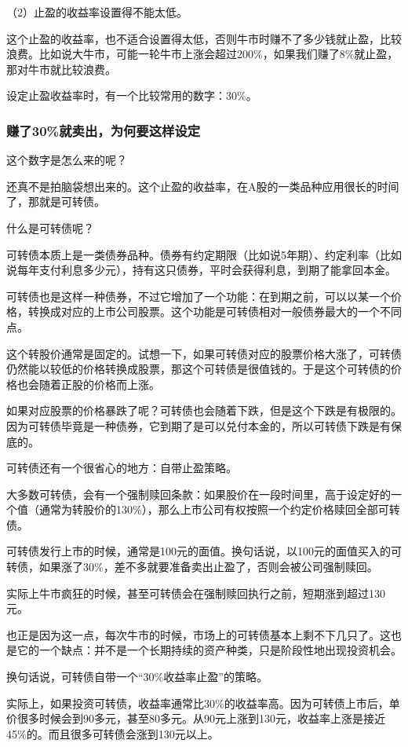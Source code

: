 （2）止盈的收益率设置得不能太低。

这个止盈的收益率，也不适合设置得太低，否则牛市时赚不了多少钱就止盈，比较浪费。比如说大牛市，可能一轮牛市上涨会超过200\%，如果我们赚了8\%就止盈，那对牛市就比较浪费。

设定止盈收益率时，有一个比较常用的数字：30\%。

\subsubsection{赚了30\%就卖出，为何要这样设定}

这个数字是怎么来的呢？

还真不是拍脑袋想出来的。这个止盈的收益率，在A股的一类品种应用很长的时间了，那就是可转债。

什么是可转债呢？

可转债本质上是一类债券品种。债券有约定期限（比如说5年期）、约定利率（比如说每年支付利息多少元），持有这只债券，平时会获得利息，到期了能拿回本金。

可转债也是这样一种债券，不过它增加了一个功能：在到期之前，可以以某一个价格，转换成对应的上市公司股票。这个功能是可转债相对一般债券最大的一个不同点。

这个转股价通常是固定的。试想一下，如果可转债对应的股票价格大涨了，可转债仍然能以较低的价格转换成股票，那这个可转债是很值钱的。于是这个可转债的价格也会随着正股的价格而上涨。

如果对应股票的价格暴跌了呢？可转债也会随着下跌，但是这个下跌是有极限的。因为可转债毕竟是一种债券，它到期了是可以兑付本金的，所以可转债下跌是有保底的。

可转债还有一个很省心的地方：自带止盈策略。

大多数可转债，会有一个强制赎回条款：如果股价在一段时间里，高于设定好的一个值（通常为转股价的130\%），那么上市公司有权按照一个约定价格赎回全部可转债。

可转债发行上市的时候，通常是100元的面值。换句话说，以100元的面值买入的可转债，如果涨了30\%，差不多就要准备卖出止盈了，否则会被公司强制赎回。

实际上牛市疯狂的时候，甚至可转债会在强制赎回执行之前，短期涨到超过130元。

也正是因为这一点，每次牛市的时候，市场上的可转债基本上剩不下几只了。这也是它的一个缺点：并不是一个长期持续的资产种类，只是阶段性地出现投资机会。

换句话说，可转债自带一个“30\%收益率止盈”的策略。

实际上，如果投资可转债，收益率通常比30\%的收益率高。因为可转债上市后，单价很多时候会到90多元，甚至80多元。从90元上涨到130元，收益率上涨是接近45\%的。而且很多可转债会涨到130元以上。


